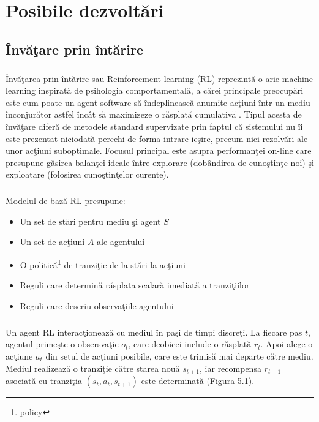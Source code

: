 \chapter{Posibile dezvolt\u ari}

\section{\^ Inv\u a\c tare prin \^ int\u arire}

\paragraph{}
\^ Inv\u a\c tarea prin \^ int\u arire sau Reinforcement learning (RL) reprezint\u a o arie machine learning inspirat\u a de psihologia comportamental\u a, a c\u arei principale preocup\u ari este cum poate un agent software s\u a \^ indeplineasc\u a anumite ac\c tiuni \^ intr-un mediu \^ inconjur\u ator astfel \^ inc\^ at s\u a maximizeze o r\u asplat\u a cumulativ\u a \cite{Sutton:1998:IRL:551283}. Tipul acesta de \^ inv\u a\c tare difer\u a de metodele standard supervizate prin faptul c\u a sistemului nu \^ ii este prezentat niciodat\u a perechi de forma intrare-ie\c sire, precum nici rezolv\u ari ale unor ac\c tiuni suboptimale. Focusul principal este asupra performan\c tei on-line care presupune g\u asirea balan\c tei ideale \^ intre explorare (dob\^ andirea de cuno\c stin\c te noi) \c si exploatare (folosirea cuno\c stin\c telor curente). 

\paragraph{}
Modelul de baz\u a RL presupune:

\begin{itemize}
	\item Un set de st\u ari pentru mediu \c si agent \(S\)
	\item Un set de ac\c tiuni \(A\) ale agentului
	\item O politic\u a\footnote{policy} de tranzi\c tie de la st\u ari la ac\c tiuni
	\item Reguli care determin\u a r\u asplata scalar\u a imediat\u a a tranzi\c tiilor
	\item Reguli care descriu observa\c tiile agentului
\end{itemize}

\paragraph{}
Un agent RL interac\c tioneaz\u a cu mediul \^ in pa\c si de timpi discre\c ti. La fiecare pas \(t\), agentul prime\c ste o obsersva\c tie \(o_t\), care deobicei include o r\u asplat\u a \(r_t\). Apoi alege o ac\c tiune \(a_t\) din setul de ac\c tiuni posibile, care este trimis\u a mai departe c\u atre mediu. Mediul realizeaz\u a o tranzi\c tie c\u atre starea nou\u a \(s_{t+1}\), iar recompensa \(r_{t+1}\) asociat\u a cu tranzi\c tia \((s_t, a_t, s_{t+1})\) este determinat\u a (Figura 5.1).

